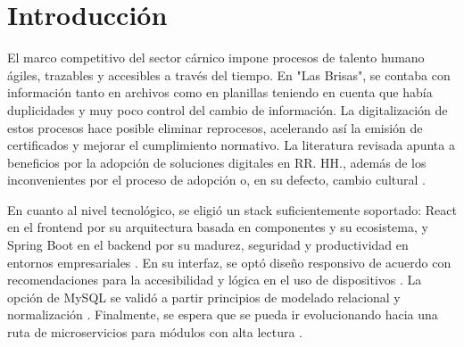 \section{Introducción}
El marco competitivo del sector cárnico impone procesos de talento humano ágiles, trazables y accesibles a través del tiempo. En "Las Brisas", se contaba con información tanto en archivos como en planillas teniendo en cuenta que había duplicidades y muy poco control del cambio de información. La digitalización de estos procesos hace posible eliminar reprocesos, acelerando así la emisión de certificados y mejorar el cumplimiento normativo. La literatura revisada apunta a beneficios por la adopción de soluciones digitales en RR. HH.,\cite{analisis_lenguajes} además de los inconvenientes por el proceso de adopción o, en su defecto, cambio cultural \cite{gestion_talento_digital}.

En cuanto al nivel tecnológico, se eligió un stack suficientemente soportado: React en el frontend por su arquitectura basada en componentes y su ecosistema, y Spring Boot en el backend por su madurez, seguridad y productividad en entornos empresariales \cite{analisis_frameworks_frontend}\cite{estudio_aplicaciones_java}. En su interfaz, se optó diseño responsivo de acuerdo con recomendaciones para la accesibilidad y lógica en el uso de dispositivos \cite{optimizacion_bootstrap}. La opción de MySQL se validó a partir principios de modelado relacional y normalización \cite{analisis_google_charts}. Finalmente, se espera que se pueda ir evolucionando hacia una ruta de microservicios para módulos con alta lectura \cite{implementacion_microservicios}.